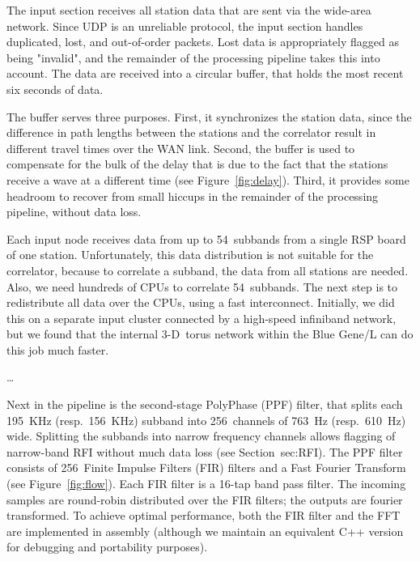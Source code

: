 \documentclass[journal]{IEEEtran}
\begin{document}

The input section receives all station data that are sent via the wide-area
network.
Since UDP is an unreliable protocol, the input section handles duplicated,
lost, and out-of-order packets.
Lost data is appropriately flagged as being "invalid", and the remainder
of the processing pipeline takes this into account.
The data are received into a circular buffer, that holds the most recent
six seconds of data.

The buffer serves three purposes.
First, it synchronizes the station data, since the difference in path lengths
between the stations and the correlator result in different travel times over
the WAN link.
Second, the buffer is used to compensate for the bulk of the delay that
is due to the fact that the stations receive a wave at a different time
(see Figure~\ref{fig:delay}).
Third, it provides some headroom to recover from small hiccups in the remainder
of the processing pipeline, without data loss.

Each input node receives data from up to 54~subbands from a single RSP board
of one station.
Unfortunately, this data distribution is not suitable for the correlator,
because to correlate a subband, the data from all stations are needed.
Also, we need hundreds of CPUs to correlate 54~subbands.
The next step is to redistribute all data over the CPUs, using a fast
interconnect.
Initially, we did this on a separate input cluster connected by a high-speed
infiniband network, but we found that the internal 3-D~torus network within
the Blue Gene/L can do this job much faster.

\ldots

Next in the pipeline is the second-stage PolyPhase (PPF) filter, that splits
each 195~KHz (resp.\ 156~KHz) subband into 256~channels of 763~Hz
(resp.\ 610~Hz) wide.
Splitting the subbands into narrow frequency channels allows flagging
of narrow-band RFI without much data loss (see Section~{sec:RFI}).
The PPF filter consists of 256~Finite Impulse Filters (FIR) filters and a
Fast Fourier Transform (see Figure~\ref{fig:flow}).
Each FIR filter is a 16-tap band pass filter.
The incoming samples are round-robin distributed over the FIR filters;
the outputs are fourier transformed.
To achieve optimal performance, both the FIR filter and the FFT are implemented
in assembly (although we maintain an equivalent C++ version for debugging
and portability purposes).
\end{document}
